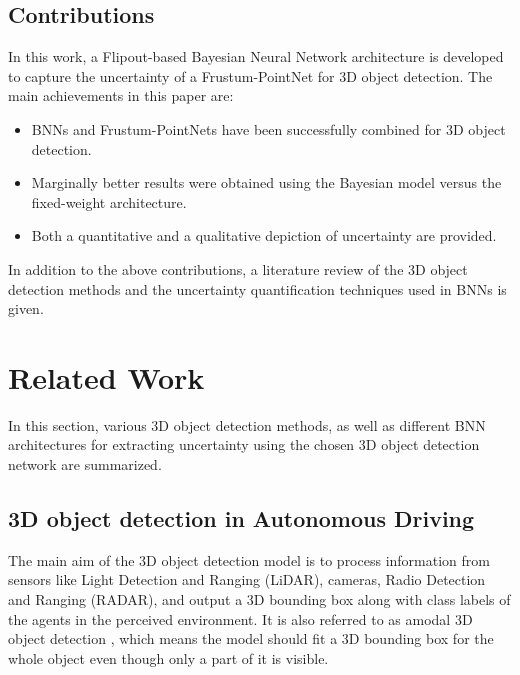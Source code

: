 \documentclass[10pt,twocolumn,letterpaper]{article}
\begin{document}
\subsection{Contributions}
In this work, a Flipout-based Bayesian Neural Network \cite{Wen2018} architecture is developed to capture the uncertainty of a Frustum-PointNet for 3D object detection. The main achievements in this paper are: 
\begin{itemize}
    \item BNNs and Frustum-PointNets have been successfully combined for 3D object detection.
    \item Marginally better results were obtained using the Bayesian model versus the fixed-weight architecture.
    \item Both a quantitative and a qualitative depiction of uncertainty are provided.
\end{itemize}
    
    In addition to the above contributions, a literature review of the 3D object detection methods and the uncertainty quantification techniques used in BNNs is given.
\section{Related Work}
In this section, various 3D object detection methods, as well as different BNN architectures for extracting uncertainty using the chosen 3D object detection network are summarized.

\subsection{3D object detection in Autonomous Driving}
The main aim of the 3D object detection model is to process information from sensors like Light Detection and Ranging (LiDAR), cameras, Radio Detection and Ranging (RADAR), and output a 3D bounding box along with class labels of the agents in the perceived environment. It is also referred to as amodal 3D object detection \cite{Arnold2019}, which means the model should fit a 3D bounding box for the whole object even though only a part of it is visible.

\end{document}
